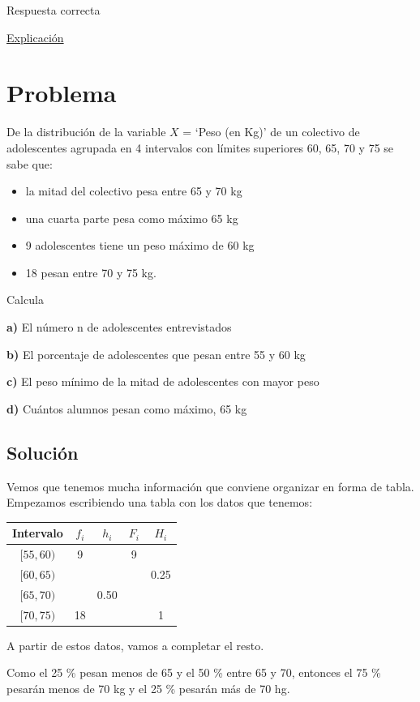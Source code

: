 \documentclass[
]{book}
\providecommand{\tightlist}{%
  \setlength{\itemsep}{0pt}\setlength{\parskip}{0pt}}
\begin{document}
Respuesta correcta

\href{https://es.wikipedia.org/wiki/Estudio_de_cohorte}{Explicación}

\hypertarget{problema-1}{%
\section{Problema}\label{problema-1}}

De la distribución de la variable \(X\) = `Peso (en Kg)' de un colectivo de adolescentes agrupada en 4 intervalos con límites superiores 60, 65, 70 y 75 se sabe que:

\begin{itemize}
\tightlist
\item
  la mitad del colectivo pesa entre 65 y 70 kg
\item
  una cuarta parte pesa como máximo 65 kg
\item
  9 adolescentes tiene un peso máximo de 60 kg
\item
  18 pesan entre 70 y 75 kg.
\end{itemize}

Calcula

\textbf{a)} El número n de adolescentes entrevistados

\textbf{b)} El porcentaje de adolescentes que pesan entre 55 y 60 kg

\textbf{c)} El peso mínimo de la mitad de adolescentes con mayor peso

\textbf{d) } Cuántos alumnos pesan como máximo, 65 kg

\hypertarget{soluciuxf3n-1}{%
\subsection{Solución}\label{soluciuxf3n-1}}

Vemos que tenemos mucha información que conviene organizar en forma de tabla. Empezamos escribiendo una tabla con los datos que tenemos:

\begin{longtable}[]{@{}ccccc@{}}
\toprule
Intervalo & \(f_i\) & \(h_i\) & \(F_i\) & \(H_i\)\tabularnewline
\midrule
\endhead
\([55,60)\) & 9 & & 9 &\tabularnewline
\([60,65)\) & & & & 0.25\tabularnewline
\([65,70)\) & & 0.50 & &\tabularnewline
\([70,75)\) & 18 & & & 1\tabularnewline
\bottomrule
\end{longtable}

A partir de estos datos, vamos a completar el resto.

Como el 25 \% pesan menos de 65 y el 50 \% entre 65 y 70, entonces el 75 \% pesarán menos de 70 kg y el 25 \% pesarán más de 70 hg.
\end{document}
